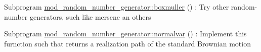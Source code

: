 
\begin{DoxyRefList}
\item[Subprogram \mbox{\hyperlink{namespacemod__random__number__generator_aa3bb4b1a0f7f2d8f6ac1d2b6518f59d6}{mod\+\_\+random\+\_\+number\+\_\+generator\+::boxmuller}} ()]\label{todo__todo000001}%
%
\+: Try other random-\/number generators, such like mersene an others  
\item[Subprogram \mbox{\hyperlink{namespacemod__random__number__generator_ab22d1a4cd14d9bdee67bd6d3d83ce9d4}{mod\+\_\+random\+\_\+number\+\_\+generator\+::normalvar}} ()]\label{todo__todo000002}%
%
\+: Implement this furnction such that returns a realization path of the standard Brownian motion 
\end{DoxyRefList}